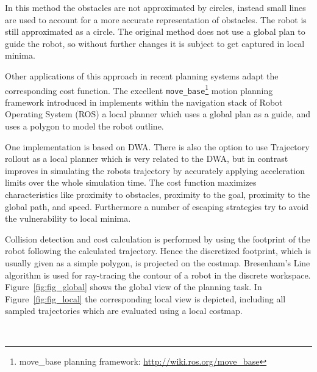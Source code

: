 In this method the obstacles are not approximated by circles, instead small lines are used to account for a more accurate representation of obstacles.
The robot is still approximated as a circle.
The original method does not use a global plan to guide the robot, so without further changes it is subject to get captured in local minima.

Other applications of this approach in recent planning systems adapt the corresponding cost function. 
The excellent \texttt{move\_base}\footnote{move\_base planning framework: \url{http://wiki.ros.org/move_base}} motion planning framework introduced in \cite{DBLP:conf/icra/Marder-EppsteinBFGK10} implements within the navigation stack of Robot Operating System (ROS) a local planner which uses a global plan as a guide, and uses a polygon to model the robot outline.

One implementation is based on DWA.
There is also the option to use Trajectory rollout \cite{gerkey08planning} as a local planner which is very related to the DWA, but in contrast improves in simulating the robots trajectory by accurately applying acceleration limits over the whole simulation time.
The cost function maximizes characteristics like proximity to obstacles, proximity to the goal, proximity to the global path, and speed.
Furthermore a number of escaping strategies try to avoid the vulnerability to local minima. 

Collision detection and cost calculation is performed by using the footprint of the robot following the calculated trajectory.
Hence the discretized footprint, which is usually given as a simple polygon, is projected on the costmap. 
Bresenham's Line algorithm \cite{bresenham1965algorithm} is used for ray-tracing the contour of a robot in the discrete workspace. 
Figure~\ref{fig:fig_global} shows the global view of the planning task. 
In Figure~\ref{fig:fig_local} the corresponding local view is depicted, including all sampled trajectories which are evaluated using a local costmap.

\begin{figure}[thpb]
	  \myfloatalign
      \footnotesize
      \centering
     \\    
   \caption[]{}
   \label{fig:fig_dwa}
\end{figure}

